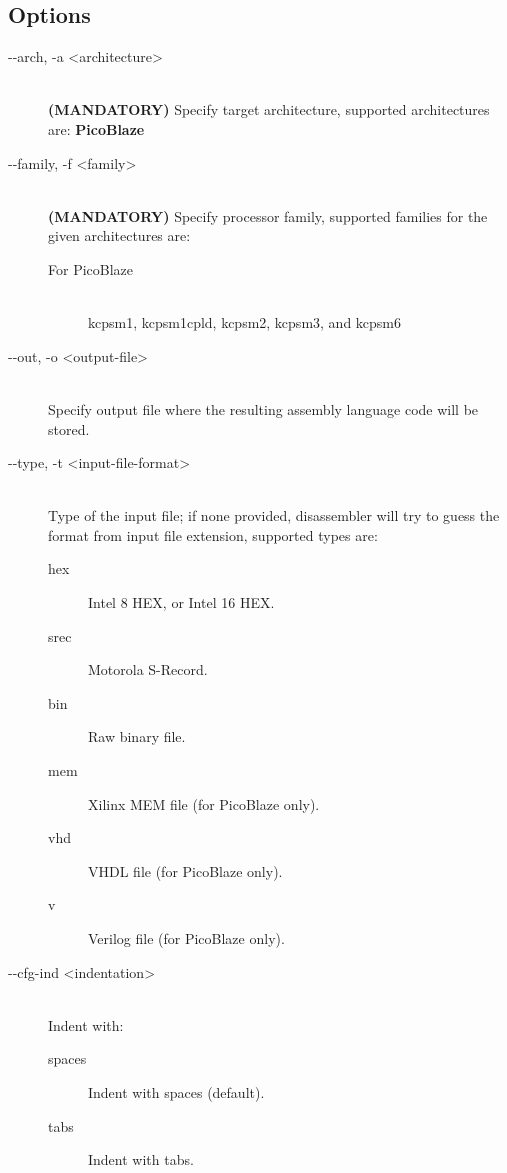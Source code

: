     \subsection{Options}
        \begin{description}
            \item[-{}-arch, -a <architecture>]~\\
                \textbf{(MANDATORY)} Specify target architecture, supported architectures are: \textbf{PicoBlaze}

            \item[-{}-family, -f <family>]~\\
                \textbf{(MANDATORY)} Specify processor family, supported families for the given architectures are:
                \begin{description}
                    \item[For PicoBlaze]~\\
                        kcpsm1, kcpsm1cpld, kcpsm2, kcpsm3, and kcpsm6
                \end{description}

            \item[-{}-out, -o <output-file>]~\\
                Specify output file where the resulting assembly language code will be stored.

            \item[-{}-type, -t <input-file-format>]~\\
                Type of the input file; if none provided, disassembler will try to guess the format from input file extension, supported types are:
                \begin{description}
                    \item [hex] Intel 8 HEX, or Intel 16 HEX.
                    \item [srec] Motorola S-Record.
                    \item [bin] Raw binary file.
                    \item [mem] Xilinx MEM file (for PicoBlaze only).
                    \item [vhd] VHDL file (for PicoBlaze only).
                    \item [v] Verilog file (for PicoBlaze only).
                \end{description}

            \item[-{}-cfg-ind <indentation>]~\\
                Indent with:
                \begin{description}
                    \item [spaces] Indent with spaces (default).
                    \item [tabs] Indent with tabs.
                \end{description}


\end{description}
